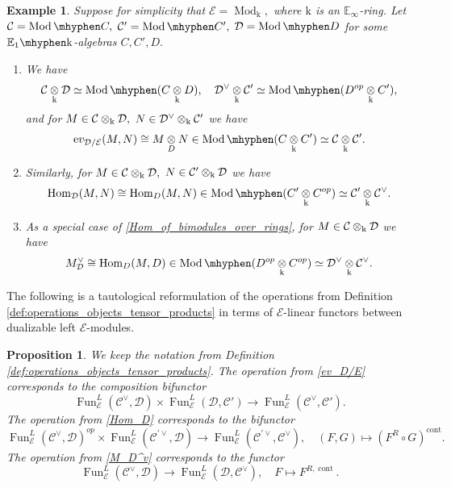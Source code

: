 \documentclass[11pt,leqno]{amsart}
\newtheorem{prop}[theo]{Proposition}
\newtheorem{example}[theo]{Example}
\numberwithin{equation}{section}
\def\Hom{\operatorname{Hom}}
\newcommand{\tens}[1]{%
  \mathbin{\mathop{\otimes}\displaylimits_{#1}}%
}
\newcommand{\hy}{\mhyphen}
\newcommand{\cont}{\operatorname{cont}}
\newcommand{\bE}{{\mathbb E}}
\newcommand{\mk}{\mathrm k}
\newcommand{\ev}{\mathrm ev}
\newcommand{\cD}{{\mathcal D}}
\newcommand{\cC}{{\mathcal C}}
\newcommand{\cE}{{\mathcal E}}
\newcommand{\Fun}{\operatorname{Fun}}
\newcommand{\Mod}{\operatorname{Mod}}
\begin{document}
\begin{example} Suppose for simplicity that $\cE = \Mod_{\mk},$ where $\mk$ is an $\bE_{\infty}$-ring. Let $\cC=\Mod\hy C,$ $\cC'=\Mod\hy C',$ $\cD=\Mod\hy D$ for some $\bE_1\hy\mk$-algebras $C,C',D.$
\begin{enumerate}[label=(\roman*),ref=(\roman*)]
\item We have
\begin{equation*}
\cC\tens{\mk}\cD\simeq \Mod\hy(C\tens{\mk}D),\quad \cD^{\vee}\tens{\mk}\cC'\simeq \Mod\hy(D^{op}\tens{\mk}C'),
\end{equation*}
and for $M\in \cC\tens{\mk}\cD,$ $N\in\cD^{\vee}\tens{\mk}\cC'$ we have
\begin{equation*}
\ev_{\cD/\cE}(M,N)\cong M\tens{D} N\in \Mod\hy(C\tens{\mk}C')\simeq \cC\tens{\mk}\cC'.
\end{equation*}
\item Similarly, for $M\in \cC\tens{\mk}\cD,$ $N\in \cC'\tens{\mk}\cD$ we have
\begin{equation*}
\Hom_{\cD}(M,N)\cong \Hom_D(M,N)\in \Mod\hy(C'\tens{\mk}C^{op})\simeq \cC'\tens{\mk}\cC^{\vee}.
\end{equation*} \label{Hom_of_bimodules_over_rings}
\item As a special case of \ref{Hom_of_bimodules_over_rings}, for $M\in \cC\tens{\mk}\cD$ we have
\begin{equation*}
M_{\cD}^{\vee}\cong \Hom_D(M,D)\in \Mod\hy(D^{op}\tens{\mk}C^{op})\simeq \cD^{\vee}\tens{\mk}\cC^{\vee}.
\end{equation*} 
\end{enumerate} 
\end{example}

The following is a tautological reformulation of the operations from Definition \ref{def:operations_objects_tensor_products} in terms of $\cE$-linear functors between dualizable left $\cE$-modules.

\begin{prop}
We keep the notation from Definition \ref{def:operations_objects_tensor_products}. The operation from \ref{ev_D/E} corresponds to the composition bifunctor
\begin{equation*}
\Fun_{\cE}^L(\cC^{\vee},\cD)\times\Fun_{\cE}^L(\cD,\cC')\to \Fun_{\cE}^L(\cC^{\vee},\cC').
\end{equation*}
The operation from \ref{Hom_D} corresponds to the bifunctor
\begin{equation*}
\Fun_{\cE}^L(\cC^{\vee},\cD)^{op}\times \Fun_{\cE}^L(\cC^{'\vee},\cD)\to \Fun_{\cE}^L(\cC^{'\vee},\cC^{\vee}),\quad (F,G)\mapsto (F^R\circ G)^{\cont}.
\end{equation*}
The operation from \ref{M_D^v} corresponds to the functor
\begin{equation*}
\Fun^L_{\cE}(\cC^{\vee},\cD)\to\Fun_{\cE}^L(\cD,\cC^{\vee}),\quad F\mapsto F^{R,\cont}.
\end{equation*}
\end{prop} 
\end{document}
